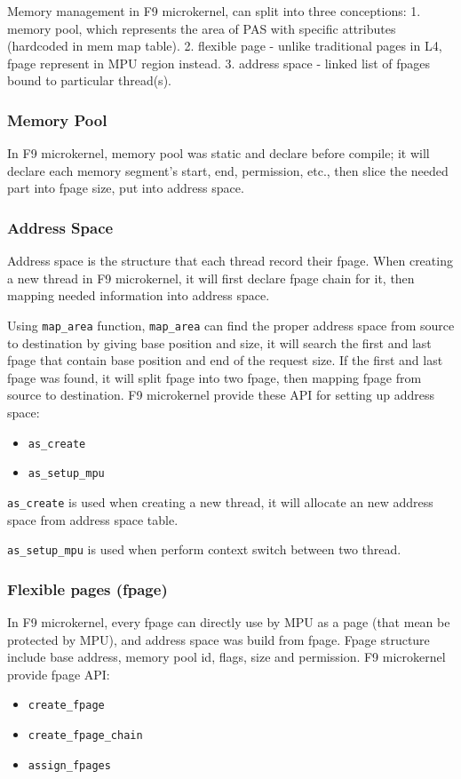 \documentclass[10pt,preprint,nocopyrightspace]{sigplanconf}
\begin{document}
Memory management in F9 microkernel, can split into three conceptions: 1. memory pool, which represents the area of PAS with specific attributes (hardcoded in mem map table). 2. flexible page - unlike traditional pages in L4, fpage represent in MPU region instead. 3. address space - linked list of fpages bound to particular thread(s).

\subsubsection{Memory Pool}
In F9 microkernel, memory pool was static and declare before compile; it will declare each memory segment's start, end, permission, etc., then slice the needed part into fpage size, put into address space.

\subsubsection{Address Space}
Address space is the structure that each thread record their fpage. When creating a new thread in F9 microkernel, it will first declare fpage chain for it, then mapping needed information into address space.

Using \texttt{map{\_}area} function, \texttt{map{\_}area} can find the proper address space from source to destination by giving base position and size, it will search the first and last fpage that contain base position and end of the request size. If the first and last fpage was found, it will split fpage into two fpage, then mapping fpage from source to destination. F9 microkernel provide these API for setting up address space: 
\begin{itemize}
\item \verb|as_create|
\item \verb|as_setup_mpu|
\end{itemize}

\verb|as_create| is used when creating a new thread, it will allocate an new address space from address space table.

\verb|as_setup_mpu| is used when perform context switch between two thread.


\subsubsection{Flexible pages (fpage)}
In F9 microkernel, every fpage can directly use by MPU as a page (that mean be protected by MPU), and address space was build from fpage. Fpage structure include base address, memory pool id, flags, size and permission. F9 microkernel provide fpage API:
\begin{itemize}
	\item \verb|create_fpage|
	\item \verb|create_fpage_chain|
	\item \verb|assign_fpages|
\end{itemize}
\end{document}

